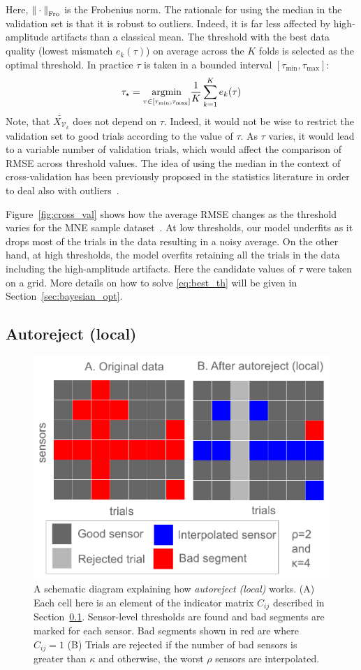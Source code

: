 Here, ${\| \cdot \|}_{\mathrm{Fro}}$ is the Frobenius norm. The rationale for using the median in the validation set is that it is robust to outliers. Indeed, it is far less affected by high-amplitude artifacts than a classical mean. The threshold with the best data quality (lowest mismatch $e_{k}(\tau)$) on average across the $K$ folds is selected as the optimal threshold. In practice $\tau$ is taken in a bounded interval $[\tau_{\min}, \tau_{\max}]$:
%
\begin{equation}
\tau_{\star} = \underset{\tau \in [\tau_{\min}, \tau_{\max}]} {\mathop{\mathrm{argmin}}} \frac{1}{K} \sum_{k=1}^{K}  e_{k}(\tau)
\label{eq:best_th}
\end{equation}
Note, that $\widetilde{X_{\mathcal{V}_k}}$ does not depend on $\tau$. Indeed, it would not be wise to restrict the validation set to good trials according to the value of $\tau$. As $\tau$ varies, it would lead to a variable number of validation trials, which would affect the comparison of RMSE across threshold values. The idea of using the median in the context of cross-validation has been previously proposed in the statistics literature in order to deal also with outliers~\citep{leung2005cross,de2003robust}.

Figure~\ref{fig:cross_val} shows how the average RMSE changes as the threshold varies for the MNE sample dataset~\citep{gramfort2013meg,mne}. At low thresholds, our model underfits as it drops most of the trials in the data resulting in a noisy average. On the other hand, at high thresholds, the model overfits retaining all the trials in the data including the high-amplitude artifacts. Here the candidate values of $\tau$ were taken on a grid. More details on how to solve \eqref{eq:best_th} will be given in Section~\ref{sec:bayesian_opt}.

\subsection{Autoreject (local)}
\label{sec:auto_local}

\begin{figure}[t]
	\centering
	\includegraphics[width=0.5\linewidth]{figures/figure3.pdf}
    \caption[A schematic diagram explaining how \emph{autoreject (local)} works.]{A schematic diagram explaining how \emph{autoreject (local)} works. (A) Each cell here is an element of the indicator matrix $C_{ij}$ described in Section~\ref{sec:auto_local}. Sensor-level thresholds are found and bad segments are marked for each sensor. Bad segments shown in red are where $C_{ij}=1$ (B) Trials are rejected if the number of bad sensors is greater than $\kappa$ and otherwise, the worst $\rho$ sensors are interpolated.}
    \label{fig:schematic}
\end{figure}

